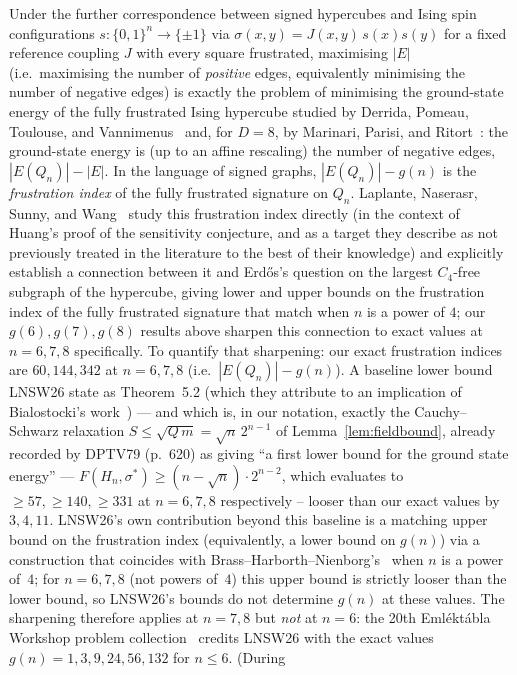 \documentclass[12pt]{article}
\begin{document}
Under the further correspondence between signed
hypercubes and Ising spin configurations $s:\{0,1\}^n\to\{\pm1\}$ via
$\sigma(x,y)=J(x,y)\,s(x)s(y)$ for a fixed reference coupling $J$ with every
square frustrated, maximising $|E|$ (i.e.\ maximising the number of
\emph{positive} edges, equivalently minimising the number of negative
edges) is exactly the problem of minimising the ground-state energy of the
fully frustrated Ising hypercube studied by Derrida, Pomeau, Toulouse, and
Vannimenus~\cite{DPTV79} and, for $D=8$, by Marinari, Parisi, and
Ritort~\cite{MPR95}: the ground-state energy is (up to an affine rescaling)
the number of negative edges, $|E(Q_n)|-|E|$. In the language of signed
graphs, $|E(Q_n)|-g(n)$ is the \emph{frustration index} of the fully
frustrated signature on $Q_n$. Laplante, Naserasr, Sunny, and
Wang~\cite{LNSW26} study this frustration index directly (in the
context of Huang's proof of the sensitivity conjecture, and as a target they
describe as not previously treated in the literature to the best of their
knowledge) and explicitly
establish a connection between it and Erd\H{o}s's question on the
largest $C_4$-free subgraph of the hypercube, giving lower and upper
bounds on the frustration index of the fully frustrated signature that
match when $n$ is a power of $4$; our $g(6),g(7),g(8)$ results above
sharpen this connection to exact values at $n=6,7,8$ specifically. To
quantify that sharpening: our exact frustration indices are $60,144,342$
at $n=6,7,8$ (i.e.\ $|E(Q_n)|-g(n)$). A baseline lower bound LNSW26
state as Theorem~5.2 (which they attribute to an implication of Bialostocki's
work~\cite{Bia83}) --- and which is, in our notation, exactly the Cauchy--Schwarz relaxation
$S\le\sqrt{Q\,m}=\sqrt n\,2^{n-1}$ of Lemma~\ref{lem:fieldbound}, already
recorded by DPTV79 (p.~620) as giving ``a first lower bound for the ground
state energy'' ---
$F(H_n,\sigma^*)\ge(n-\sqrt n)\cdot2^{n-2}$, which evaluates to
$\ge57,\ge140,\ge331$ at $n=6,7,8$ respectively -- looser than our exact
values by $3,4,11$. LNSW26's own contribution beyond this baseline is
a matching upper bound on the frustration index (equivalently, a lower
bound on $g(n)$) via a construction that coincides with
Brass--Harborth--Nienborg's~\cite{BHN95} when $n$ is a power of~$4$;
for $n=6,7,8$ (not powers of~$4$) this upper bound is
strictly looser than the lower bound, so LNSW26's bounds
do not determine $g(n)$ at these values. The sharpening therefore applies at $n=7,8$ but \emph{not} at $n=6$:
the 20th Emléktábla Workshop problem collection~\cite{Emlek26} credits
LNSW26 with the exact values $g(n)=1,3,9,24,56,132$ for $n\le6$. (During
\end{document}
